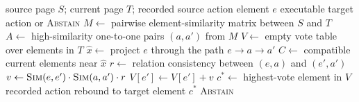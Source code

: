 \begin{algorithm}[t]
\caption{Anchor-based action transfer for one recorded action}
\label{alg:anchor-transfer}
\small
\begin{algorithmic}[1]
\Require source page $S$; current page $T$; recorded source action element $e$
\Ensure executable target action or \textsc{Abstain}
\State $M \gets$ pairwise element-similarity matrix between $S$ and $T$
\State $A \gets$ high-similarity one-to-one pairs $(a,a')$ from $M$
\State $V \gets$ empty vote table over elements in $T$
  \State $\hat{x} \gets$ project $e$ through the path $e \rightarrow a \rightarrow a'$
  \State $C \gets$ compatible current elements near $\hat{x}$
    \State $r \gets$ relation consistency between $(e,a)$ and $(e',a')$
    \State $v \gets \textsc{Sim}(e,e') \cdot \textsc{Sim}(a,a') \cdot r$
    \State $V[e'] \gets V[e'] + v$
  \EndFor
\EndFor
\State $c^* \gets$ highest-vote element in $V$
  \State \Return recorded action rebound to target element $c^*$
\Else
  \State \Return \textsc{Abstain}
\EndIf
\end{algorithmic}
\end{algorithm}